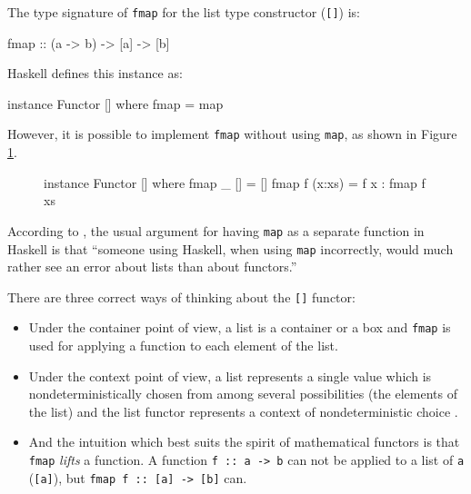 \begin{example}[\texttt{[]}]
  \label{ex:functor-list-haskell}

  \index{\texttt{[]}}
  The type signature of \texttt{fmap} for the list type constructor
  (\texttt{[]}) is:
  \begin{codehaskell}
    fmap :: (a -> b) -> [a] -> [b]
  \end{codehaskell}

  Haskell defines this instance as:
  \begin{codehaskell}
    instance Functor [] where
      fmap = map
  \end{codehaskell}
  However, it is possible to implement \texttt{fmap} without using
  \texttt{map}, as shown in Figure \ref{fig:functor-list-haskell}.
  \begin{figure}[htbp]
    \begin{codehaskell}
    instance Functor [] where
      fmap _ []     = []
      fmap f (x:xs) = f x : fmap f xs
    \end{codehaskell}
    \caption{}
    \label{fig:functor-list-haskell}
  \end{figure}

  According to \parencite{yorgey-2009}, the usual argument for
  having \texttt{map} as a separate function in Haskell is that
  ``someone using Haskell, when using \texttt{map} incorrectly, would
  much rather see an error about lists than about functors.''

  There are three correct ways of thinking about the \texttt{[]}
  functor:
  \begin{itemize}
  \item
    Under the container point of view, a list is a container or a box and
    \texttt{fmap} is used for applying a function to each element of the
    list.
  \item
    Under the context point of view, a list represents a single value
    which is nondeterministically chosen from among several
    possibilities (the elements of the list) and the list functor
    represents a context of nondeterministic choice
    \parencite{yorgey-2009}.
  \item
    And the intuition which best suits the spirit of mathematical
    functors is that \texttt{fmap} \emph{lifts} a function. A function
    \texttt{f :: a -> b} can not be applied to a list of \texttt{a}
    (\texttt{[a]}), but \texttt{fmap f :: [a] -> [b]} can.
  \end{itemize}


\end{example}
